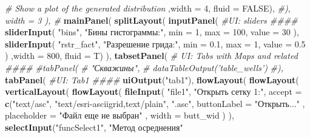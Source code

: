 \documentclass[]{article}
\newenvironment{Shaded}{\begin{snugshade}}{\end{snugshade}}
\newcommand{\KeywordTok}[1]{\textcolor[rgb]{0.13,0.29,0.53}{\textbf{#1}}}
\newcommand{\DataTypeTok}[1]{\textcolor[rgb]{0.13,0.29,0.53}{#1}}
\newcommand{\DecValTok}[1]{\textcolor[rgb]{0.00,0.00,0.81}{#1}}
\newcommand{\FloatTok}[1]{\textcolor[rgb]{0.00,0.00,0.81}{#1}}
\newcommand{\StringTok}[1]{\textcolor[rgb]{0.31,0.60,0.02}{#1}}
\newcommand{\CommentTok}[1]{\textcolor[rgb]{0.56,0.35,0.01}{\textit{#1}}}
\newcommand{\OtherTok}[1]{\textcolor[rgb]{0.56,0.35,0.01}{#1}}
\newcommand{\NormalTok}[1]{#1}
\begin{document}
\begin{Shaded}
\begin{Highlighting}[]
      \CommentTok{# Show a plot of the generated distribution}
\NormalTok{      ,}\DataTypeTok{width =} \DecValTok{4}\NormalTok{, }\DataTypeTok{fluid =} \OtherTok{FALSE}\NormalTok{),}
    \CommentTok{#), width = 3 ), #}
    \KeywordTok{mainPanel}\NormalTok{(}
      \KeywordTok{splitLayout}\NormalTok{(}
      \KeywordTok{inputPanel}\NormalTok{(}
        \CommentTok{#UI: sliders ####}
        \KeywordTok{sliderInput}\NormalTok{(}
          \StringTok{"bins"}\NormalTok{,}
          \StringTok{"Бины гистограммы:"}\NormalTok{,}
          \DataTypeTok{min =} \DecValTok{1}\NormalTok{,}
          \DataTypeTok{max =} \DecValTok{100}\NormalTok{,}
          \DataTypeTok{value =} \DecValTok{30}
\NormalTok{        ),}
        \KeywordTok{sliderInput}\NormalTok{(}
          \StringTok{"rstr_fact"}\NormalTok{,}
          \StringTok{"Разрешение грида:"}\NormalTok{,}
          \DataTypeTok{min =} \FloatTok{0.1}\NormalTok{,}
          \DataTypeTok{max =} \DecValTok{1}\NormalTok{,}
          \DataTypeTok{value =} \FloatTok{0.5}
\NormalTok{        )}
\NormalTok{        ,}\DataTypeTok{width =} \DecValTok{800}\NormalTok{, }\DataTypeTok{fluid =}\NormalTok{ T)}
\NormalTok{      ),}
      \KeywordTok{tabsetPanel}\NormalTok{(}
        \CommentTok{# UI: Tabs with Maps and related ####}
        \CommentTok{#tabPanel(}
        \CommentTok{#  "Скважины",}
        \CommentTok{#   dataTableOutput('table_wells')}
        \CommentTok{#),}
        \KeywordTok{tabPanel}\NormalTok{(}
          \CommentTok{#UI: Tab1 ####}
          \KeywordTok{uiOutput}\NormalTok{(}\StringTok{"tab1"}\NormalTok{),}
          \KeywordTok{flowLayout}\NormalTok{(}
          \KeywordTok{flowLayout}\NormalTok{(}
            \KeywordTok{verticalLayout}\NormalTok{(}
              \KeywordTok{flowLayout}\NormalTok{(}
                \KeywordTok{fileInput}\NormalTok{(}
                \StringTok{"file1"}\NormalTok{,}
                \StringTok{"Открыть сетку 1:"}\NormalTok{,}
                \DataTypeTok{accept =} \KeywordTok{c}\NormalTok{(}\StringTok{"text/asc"}\NormalTok{,}
                           \StringTok{"text/esri-asciigrid,text/plain"}\NormalTok{,}
                           \StringTok{".asc"}\NormalTok{,}
                           \DataTypeTok{buttonLabel =} \StringTok{"Открыть..."}
\NormalTok{                           , }\DataTypeTok{placeholder =} \StringTok{"Файл еще не выбран"}
\NormalTok{                           , }\DataTypeTok{width =}\NormalTok{ butt_wid}
\NormalTok{                           )}
\NormalTok{              ),}
              \KeywordTok{selectInput}\NormalTok{(}\StringTok{"funcSelect1"}\NormalTok{, }\StringTok{"Метод осреднения"}

\end{Highlighting}
\end{Shaded}
\end{document}
